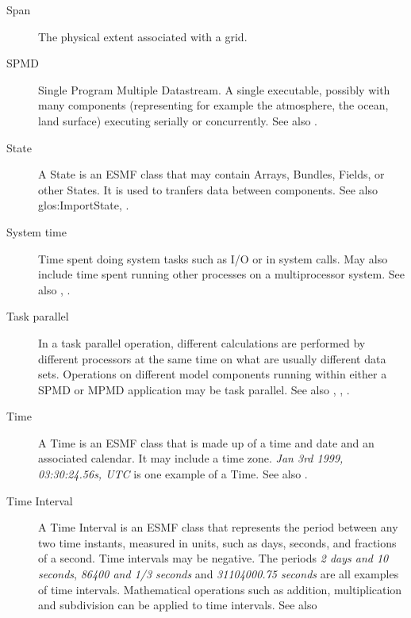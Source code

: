 \begin{description}
\item[Span] \label{glos:Span} The physical extent associated with a grid.

\item[SPMD] \label{glos:SPMD} Single Program Multiple Datastream. 
  A single executable, possibly with many components (representing 
  for example the atmosphere, the ocean, land surface) executing 
  serially or concurrently. See also . 

\item [State] \label{glos:State} A State is an ESMF class that may 
  contain Arrays, Bundles, Fields, or other States.  It is used to 
  tranfers data between components.  See also 
  {glos:ImportState}, .

\item [System time] \label{glos:SysTime} Time spent doing system tasks 
  such as I/O or in system calls.  May also include time spent running 
  other processes on a multiprocessor system. See also , .

\item[Task parallel] \label{glos:TaskParallel}  In a task parallel operation,
  different calculations are performed by different processors at the same time
  on what are usually different data sets.  Operations on different model 
  components running within either a SPMD or MPMD application may be task 
  parallel. See also , 
  , . 

\item [Time] \label{glos:TimeInstant}
  A Time is an ESMF class that is made up of a time and date and an 
  associated calendar. It may include a time zone.
  \emph{Jan 3rd 1999, 03:30:24.56s, UTC} is one example of a Time.
  See also .

\item [Time Interval] \label{glos:TimeInterval} A Time Interval is an
  ESMF class that represents the
  period between any two time instants, measured in units, such as days, 
  seconds, and fractions of a second.  Time intervals may be 
  negative.  The periods \emph{2 days and 10 seconds}, 
  \emph{86400 and 1/3 seconds} and \emph{31104000.75 seconds} are all 
  examples of time intervals.  
  Mathematical operations such as addition, multiplication and subdivision 
  can be applied to time intervals. See also 


\end{description}
